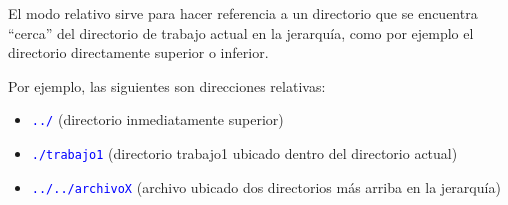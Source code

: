 \documentclass[12pt]{article}
\newcommand{\cw}[1]{\mbox{\texttt{\textcolor{blue}{#1}}}}
\begin{document}
El modo relativo sirve para hacer referencia a un directorio que se encuentra
``cerca'' del directorio de trabajo actual en la jerarquía, como por ejemplo
el directorio directamente superior o inferior.

Por ejemplo, las siguientes son direcciones relativas:

\vspace{-2\topsep}
\begin{itemize}

    \itemsep2pt \parskip0pt 

    \item \cw{../} (directorio inmediatamente superior)

    \item \cw{./trabajo1} (directorio trabajo1 ubicado dentro del directorio
        actual)

    \item \cw{../../archivoX} (archivo ubicado dos directorios más arriba en
        la jerarquía)

\end{itemize}
\end{document}
